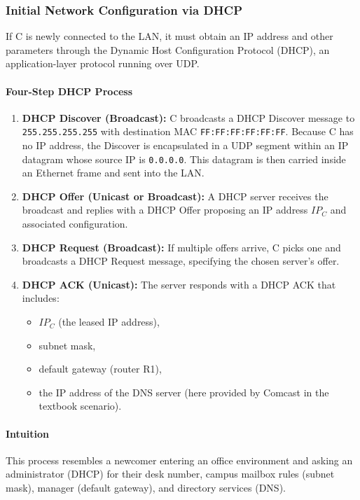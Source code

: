 \documentclass[12pt]{article}
\begin{document}
\subsubsection{Initial Network Configuration via DHCP}

If C is newly connected to the LAN, it must obtain an IP address and other parameters through the Dynamic Host Configuration Protocol (DHCP), an application-layer protocol running over UDP.

\paragraph{Four-Step DHCP Process}
\begin{enumerate}
    \item \textbf{DHCP Discover (Broadcast):}
          C broadcasts a DHCP Discover message to \texttt{255.255.255.255} with destination MAC \texttt{FF:FF:FF:FF:FF:FF}. Because C has no IP address, the Discover is encapsulated in a UDP segment within an IP datagram whose source IP is \texttt{0.0.0.0}. This datagram is then carried inside an Ethernet frame and sent into the LAN.

    \item \textbf{DHCP Offer (Unicast or Broadcast):}
          A DHCP server receives the broadcast and replies with a DHCP Offer proposing an IP address $IP_C$ and associated configuration.

    \item \textbf{DHCP Request (Broadcast):}
          If multiple offers arrive, C picks one and broadcasts a DHCP Request message, specifying the chosen server's offer.

    \item \textbf{DHCP ACK (Unicast):}
          The server responds with a DHCP ACK that includes:
          \begin{itemize}
              \item $IP_C$ (the leased IP address),
              \item subnet mask,
              \item default gateway (router R1),
              \item the IP address of the DNS server (here provided by Comcast in the textbook scenario).
          \end{itemize}
\end{enumerate}

\paragraph{Intuition}
This process resembles a newcomer entering an office environment and asking an administrator (DHCP) for their desk number, campus mailbox rules (subnet mask), manager (default gateway), and directory services (DNS).
\end{document}
